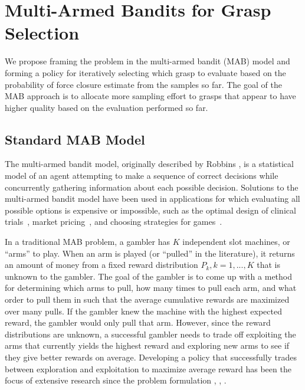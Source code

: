 \documentclass[journal,transmag]{IEEEtran}%
\begin{document}
\section{Multi-Armed Bandits for Grasp Selection}
\label{sec:MAB}
We propose framing the problem in the multi-armed bandit (MAB) model and forming a policy for iteratively selecting which grasp to evaluate based on the probability of force closure estimate from the samples so far.
The goal of the MAB approach is to allocate more sampling effort to grasps that appear to have higher quality based on the evaluation performed so far.

\subsection{Standard MAB Model}
The multi-armed bandit model, originally described by Robbins \cite{robbins1985some}, is a statistical model of an agent attempting to make a sequence of correct decisions while concurrently gathering information about each possible decision.
Solutions to the multi-armed bandit model have been used in applications for which evaluating all possible options is expensive or impossible, such as the optimal design of clinical trials~\cite{simon1989optimal}, market pricing~\cite{rothschild1974two}, and choosing strategies for games~\cite{st2012online}. 

In a traditional MAB problem, a gambler has $K$ independent slot machines, or ``arms'' to play.
When an arm is played (or ``pulled'' in the literature), it returns an amount of money from a fixed reward distribution $P_k, k = 1, ..., K$ that is unknown to the gambler.
The goal of the gambler is to come up with a method for determining which arms to pull, how many times to pull each arm, and what order to pull them in such that the average cumulative rewards are maximized over many pulls.
If the gambler knew the machine with the highest expected reward, the gambler would only pull that arm.
However, since the reward distributions are unknown, a successful gambler needs to trade off exploiting the arms that currently yields the highest reward and exploring new arms to see if they give better rewards on average.
Developing a policy that successfully trades between exploration and exploitation to maximize average reward has been the focus of extensive research since the problem formulation \cite{bubeck2009pure}, \cite{robbins1985some}, \cite{bergemann2006bandit}.
\end{document}
